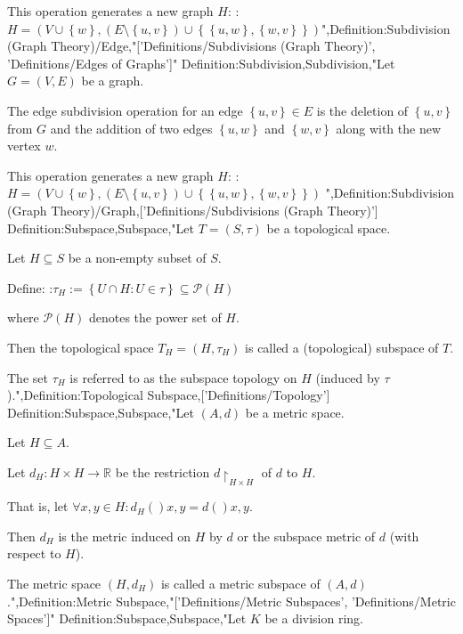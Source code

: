 This operation generates a new graph $H$:
:$H = \left( V \cup \left\lbrace w \right\rbrace, \left( E \setminus \left\lbrace u, v \right\rbrace  \right) \cup \left\lbrace \left\lbrace u, w \right\rbrace, \left\lbrace w, v \right\rbrace  \right\rbrace  \right)$",Definition:Subdivision (Graph Theory)/Edge,"['Definitions/Subdivisions (Graph Theory)', 'Definitions/Edges of Graphs']"
Definition:Subdivision,Subdivision,"Let $G = \left( V, E \right)$ be a graph.


The edge subdivision operation for an edge $\left\lbrace u, v \right\rbrace \in E$ is the deletion of $\left\lbrace u, v \right\rbrace$ from $G$ and the addition of two edges $\left\lbrace u, w \right\rbrace$ and $\left\lbrace w, v \right\rbrace$ along with the new vertex $w$. 


This operation generates a new graph $H$:
:$H = \left( V \cup \left\lbrace w \right\rbrace, \left( E \setminus \left\lbrace u, v \right\rbrace  \right) \cup \left\lbrace \left\lbrace u, w \right\rbrace, \left\lbrace w, v \right\rbrace  \right\rbrace  \right)$
",Definition:Subdivision (Graph Theory)/Graph,['Definitions/Subdivisions (Graph Theory)']
Definition:Subspace,Subspace,"Let $T = \left( S, \tau \right)$ be a topological space.

Let $H \subseteq S$ be a non-empty subset of $S$.


Define:
:$\tau_H := \left\lbrace U \cap H: U \in \tau \right\rbrace \subseteq \mathcal P \left( H \right)$

where $\mathcal P \left( H \right)$ denotes the power set of $H$.


Then the topological space $T_H = \left( H, \tau_H \right)$ is called a (topological) subspace of $T$.


The set $\tau_H$ is referred to as the subspace topology on $H$ (induced by $\tau$).",Definition:Topological Subspace,['Definitions/Topology']
Definition:Subspace,Subspace,"Let $\left( A, d \right)$ be a metric space.

Let $H \subseteq A$.

Let $d_H: H \times H \to \mathbb R$ be the restriction $d \restriction_{H \times H}$ of $d$ to $H$.

That is, let $\forall x, y \in H: d_H \left(   \right){x, y} = d \left(   \right){x, y}$.


Then $d_H$ is the metric induced on $H$ by $d$ or the subspace metric of $d$ (with respect to $H$).


The metric space $\left( H, d_H \right)$ is called a metric subspace of $\left( A, d \right)$.",Definition:Metric Subspace,"['Definitions/Metric Subspaces', 'Definitions/Metric Spaces']"
Definition:Subspace,Subspace,"Let $K$ be a division ring.

